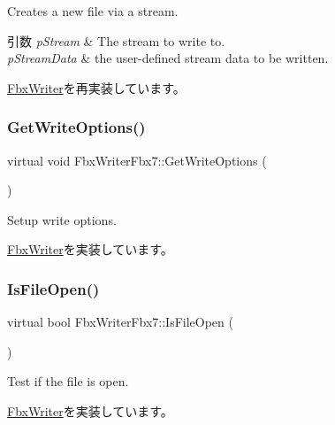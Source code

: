 Creates a new file via a stream. 
\begin{DoxyParams}{引数}
{\em p\+Stream} & The stream to write to. \\
\hline
{\em p\+Stream\+Data} & the user-\/defined stream data to be written. \\
\hline
\end{DoxyParams}


\hyperlink{class_fbx_writer_a9b64b6230b05e64a83b78b36d1667da7}{Fbx\+Writer}を再実装しています。

\mbox{\label{class_fbx_writer_fbx7_a881561770b711a6419b45fbe81e4ee94}} 
\subsubsection{\texorpdfstring{Get\+Write\+Options()}{GetWriteOptions()}}
{\footnotesize\ttfamily virtual void Fbx\+Writer\+Fbx7\+::\+Get\+Write\+Options (\begin{DoxyParamCaption}{ }\end{DoxyParamCaption})\hspace{0.3cm}{\ttfamily [virtual]}}

Setup write options. 

\hyperlink{class_fbx_writer_ad237f5cd183ae29f744aee32b7aa5525}{Fbx\+Writer}を実装しています。

\mbox{\label{class_fbx_writer_fbx7_ad9f82dc72129c63eda20dcccda7db53b}} 
\subsubsection{\texorpdfstring{Is\+File\+Open()}{IsFileOpen()}}
{\footnotesize\ttfamily virtual bool Fbx\+Writer\+Fbx7\+::\+Is\+File\+Open (\begin{DoxyParamCaption}{ }\end{DoxyParamCaption})\hspace{0.3cm}{\ttfamily [virtual]}}

Test if the file is open. 

\hyperlink{class_fbx_writer_ab70be3aaebd304af11cdce5e225cce68}{Fbx\+Writer}を実装しています。

